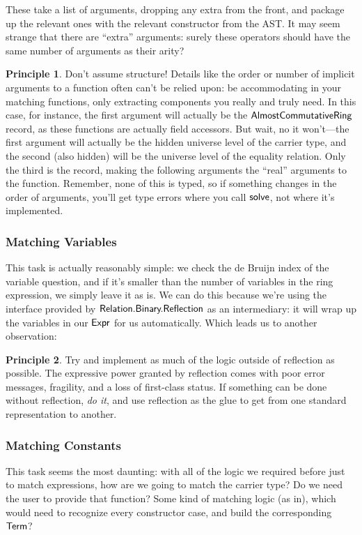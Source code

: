 \documentclass[draft, twocolumn]{article}
\theoremstyle{definition}
\theoremstyle{definition}
\newtheorem{principle}{Principle}[section]
\begin{document}
These take a list of arguments, dropping any extra from the front, and package
up the relevant ones with the relevant constructor from the AST. It may seem
strange that there are ``extra'' arguments: surely these operators should have
the same number of arguments as their arity?

\begin{principle}{Don't assume structure!}
  Details like the order or number of implicit arguments to a function often
  can't be relied upon: be accommodating in your matching functions, only
  extracting components you really and truly need. In this case, for instance,
  the first argument will actually be the
  \(\AgdaDatatype{AlmostCommutativeRing}\) record, as these functions are
  actually field accessors. But wait, no it won't---the first argument will
  actually be the hidden universe level of the carrier type, and the second
  (also hidden) will be the universe level of the equality relation. Only the
  third is the record, making the following arguments the ``real'' arguments to
  the function. Remember, none of this is typed, so if something changes in the
  order of arguments, you'll get type errors where you call
  \(\AgdaMacro{solve}\), not where it's implemented.
\end{principle}
\subsubsection{Matching Variables}
This task is actually reasonably simple: we check the de Bruijn index of the
variable question, and if it's smaller than the number of variables in the ring
expression, we simply leave it as is. We can do this because we're using the
interface provided by \(\AgdaModule{Relation.Binary.Reflection}\) as an
intermediary: it will wrap up the variables in our \(\AgdaDatatype{Expr}\) for
us automatically. Which leads us to another observation:
\begin{principle}{Try and implement as much of the logic outside of reflection
    as possible.}
  The expressive power granted by reflection comes with poor error messages,
  fragility, and a loss of first-class status. If something can be done without
  reflection, \emph{do it}, and use reflection as the glue to get from one
  standard representation to another.
\end{principle}
\subsubsection{Matching Constants}
This task seems the most daunting: with all of the logic we required before just
to match expressions, how are we going to match the carrier type? Do we need the
user to provide that function? Some kind of matching logic (as
in\cite{jedynak_simple_2018}), which would need to recognize every constructor
case, and build the corresponding \(\AgdaDatatype{Term}\)?
\end{document}
